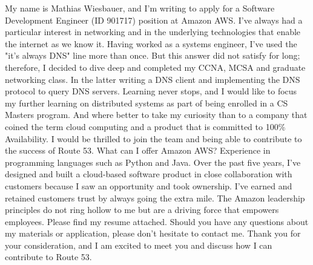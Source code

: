 \cvletter{}

\cvparagraph{}
  {My name is Mathias Wiesbauer, and I’m writing to apply for a Software Development Engineer (ID 901717) position at Amazon AWS.}
\cvparagraph{}
  {I've always had a particular interest in networking and in the underlying technologies that enable the internet as we know it. Having worked as a systems engineer, I've used the "it's always DNS" line more than once. But this answer did not satisfy for long; therefore, I decided to dive deep and completed my CCNA, MCSA and graduate networking class. In the latter writing a DNS client and implementing the DNS protocol to query DNS servers.}
\cvparagraph{}
  {Learning never stops, and I would like to focus my further learning on distributed systems as part of being enrolled in a CS Masters program. And where better to take my curiosity than to a company that coined the term cloud computing and a product that is committed to 100\% Availability. I would be thrilled to join the team and being able to contribute to the success of Route 53.}
\cvparagraph{}
  {What can I offer Amazon AWS? Experience in programming languages such as Python and Java. Over the past five years, I've designed and built a cloud-based software product in close collaboration with customers because I saw an opportunity and took ownership. I've earned and retained customers trust by always going the extra mile. The Amazon leadership principles do not ring hollow to me but are a driving force that empowers employees.}
\cvparagraph{}
  {Please find my resume attached. Should you have any questions about my materials or application, please don’t hesitate to contact me.}
\cvparagraph{}
  {Thank you for your consideration, and I am excited to meet you and discuss how I can contribute to Route 53.}